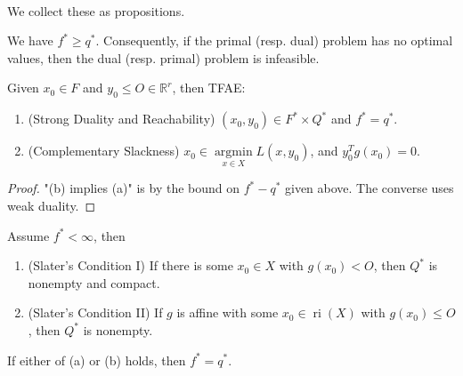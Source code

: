 \paragraph{}We collect these as propositions.

\begin{prop}\label{prop:042-weak-duality}
	We have $f^\ast\geq q^\ast$. Consequently, if the primal (resp. dual) problem has no optimal values, then the dual (resp. primal) problem is infeasible.
\end{prop}

\begin{prop}\label{prop:042-complementary-slackness}
	Given $x_0\in F$ and $y_0\leq O\in \mathbb{R}^r$, then TFAE:
	\begin{enumerate}[label=(\alph*)]
		\item (Strong Duality and Reachability) $(x_0,y_0)\in F^\ast\times Q^\ast$ and $f^\ast=q^\ast$.
		\item (Complementary Slackness) $x_0\in \underset{x\in X}{\operatorname{argmin}}L(x,y_0)$, and $y_0^Tg(x_0)=0$.
	\end{enumerate}
\end{prop}

\begin{proof}
	"(b) implies (a)" is by the bound on $f^\ast - q^\ast$ given above. The converse uses weak duality.
\end{proof}

\begin{prop}\label{prop:042-slater-optimality}
	Assume $f^\ast<\infty$, then
	\begin{enumerate}[label=(\alph*)]
		\item (Slater's Condition I) If there is some $x_0\in X$ with $g(x_0)<O$, then $Q^\ast$ is nonempty and compact.
		\item (Slater's Condition II) If $g$ is affine with some $x_0\in \operatorname{ri}(X)$ with $g(x_0)\leq O$, then $Q^\ast$ is nonempty.
	\end{enumerate}
	If either of (a) or (b) holds, then $f^\ast=q^\ast$.
\end{prop}
